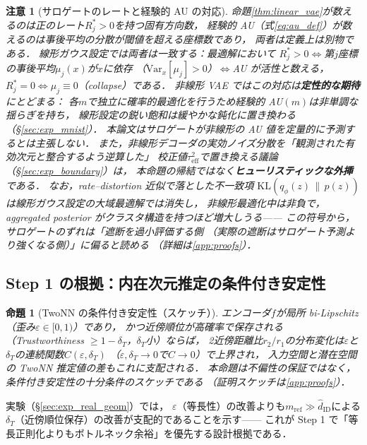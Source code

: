 \documentclass[11pt,a4paper]{jsarticle}
\newtheorem{proposition}{命題}
\newtheorem{remark}{注意}
\newcommand{\hatdID}{\hat{d}_{\mathrm{ID}}}
\begin{document}
\begin{remark}[サロゲートのレートと経験的 AU の対応]\label{rem:bridge}
命題\ref{thm:linear_vae}が数えるのは正のレート$R_j^* > 0$を持つ固有方向数，
経験的 AU（式\eqref{eq:au_def}）が数えるのは事後平均の分散が閾値を超える座標数であり，
両者は定義上は別物である．
線形ガウス設定では両者は一致する：最適解において
$R_j^* > 0 \iff$第$j$座標の事後平均$\mu_j(x)$が$x$に依存
（$\mathrm{Var}_x[\mu_j] > 0$）$\iff$AU が活性と数える，
$R_j^* = 0 \iff \mu_j \equiv 0$（collapse）である．
非線形 VAE ではこの対応は\textbf{定性的な期待}にとどまる：
各$m$で独立に確率的最適化を行うため経験的 AU$(m)$は非単調な揺らぎを持ち，
線形設定の鋭い飽和は緩やかな鈍化に置き換わる（§\ref{sec:exp_mnist}）．
本論文はサロゲートが非線形の AU 値を定量的に予測するとは主張しない．
また，非線形デコーダの実効ノイズ分散を「観測された有効次元と整合するよう逆算した」
校正値$\tau^2_{\mathrm{eff}}$で置き換える議論（§\ref{sec:exp_boundary}）は，
本命題の帰結ではなく\textbf{ヒューリスティックな外挿}である．
なお，rate--distortion 近似で落とした不一致項
$\mathrm{KL}(q_\phi(z)\,\|\,p(z))$は線形ガウス設定の大域最適解では消失し，
非線形最適化中は非負で，aggregated posterior がクラスタ構造を持つほど増大しうる——
この符号から，サロゲートのずれは「遮断を過小評価する側
（実際の遮断はサロゲート予測より強くなる側）」に偏ると読める
（詳細は\ref{app:proofs}）．
\end{remark}

\subsection{Step 1 の根拠：内在次元推定の条件付き安定性}\label{sec:theory_twonn}

\begin{proposition}[TwoNN の条件付き安定性（スケッチ）]\label{thm:twonn_stability}
エンコーダ$f$が局所 bi-Lipschitz（歪み$\varepsilon \in [0,1)$）であり，
かつ近傍順位が高確率で保存される（Trustworthiness $\geq 1 - \delta_T$，$\delta_T$小）ならば，
2近傍距離比$r_2/r_1$の分布変化は$\varepsilon$と$\delta_T$の連続関数$C(\varepsilon, \delta_T)$
（$\varepsilon, \delta_T \to 0$で$C \to 0$）で上界され，
入力空間と潜在空間の TwoNN 推定値の差もこれに支配される．
本命題は不偏性の保証ではなく，条件付き安定性の十分条件のスケッチである
（証明スケッチは\ref{app:proofs}）．
\end{proposition}

実験（§\ref{sec:exp_real_geom}）では，
$\varepsilon$（等長性）の改善よりも$m_{\mathrm{ref}} \gg \hatdID$による
$\delta_T$（近傍順位保存）の改善が支配的であることを示す——
これが Step 1 で「等長正則化よりもボトルネック余裕」を優先する設計根拠である．
\end{document}
